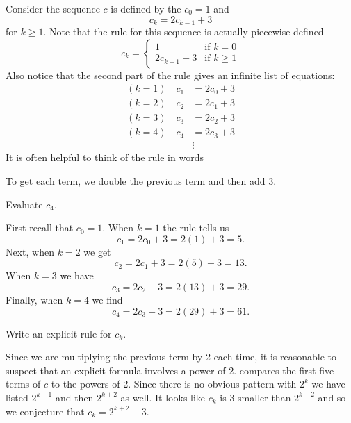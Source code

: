 \begin{exam}
\label{exam_double_and_add3}
    Consider the sequence $c$ is defined by the $c_0=1$ and $$c_k=2c_{k-1}+3$$
    for $k \ge 1$.  Note that the rule for this sequence is actually piecewise-defined
        $$c_k = \left\{\begin{array}{cl}
        1 & \text{if } k=0 \\
        2c_{k-1}+3 & \text{if } k\ge 1 \end{array} \right.$$
    Also notice that the second part of the rule gives an infinite list of equations:
        \begin{align*}
            (k=1) \quad c_1&=2c_0+3 \\
            (k=2) \quad c_2&=2c_1+3 \\
            (k=3) \quad c_3&=2c_2+3 \\
            (k=4) \quad c_4&=2c_3+3 \\
            & \vdots
        \end{align*}
        It is often helpful to think of the rule in words
            \begin{center}
                To get each term, we double the previous term and then add 3.
            \end{center}
    \begin{actpart}
        \item Evaluate $c_4$.
            \begin{soln}
                First recall that $c_0=1$.  When $k=1$ the rule tells us
                    $$c_1=2c_0+3=2(1)+3=5.$$
                Next, when $k=2$ we get
                    $$c_2=2c_1+3=2(5)+3=13.$$
                When $k=3$ we have
                    $$c_3=2c_2+3=2(13)+3 = 29.$$
                Finally, when $k=4$ we find
                    $$c_4=2c_3+3=2(29)+3=61.$$   
            \end{soln}
        \item Write an explicit rule for $c_k$.  
            \begin{soln}
                Since we are multiplying the previous term by 2 each time, it is reasonable to suspect that an explicit formula involves a power of 2.  compares the first five terms of $c$ to the powers of 2. Since there is no obvious pattern with $2^k$ we have listed $2^{k+1}$ and then $2^{k+2}$ as well. It looks like $c_k$ is 3 smaller than $2^{k+2}$ and so we conjecture that $c_k=2^{k+2}-3$. 


\end{soln}
\end{actpart}
\end{exam}
